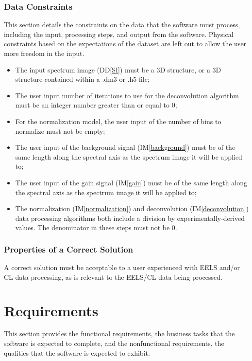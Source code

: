 \documentclass[12pt]{article}
\newcommand{\ddref}[1]{DD\ref{#1}}
\newcommand{\iref}[1]{IM\ref{#1}}
\begin{document}
\subsubsection{Data Constraints} \label{sec_DataConstraints}    
This section details the constraints on the data that the software must process, including the input, processing steps, and output from the software. Physical constraints based on the expectations of the dataset are left out to allow the user more freedom in the input.

\begin{itemize}
	\item The input spectrum image (\ddref{SI}) must be a 3D structure, or a 3D structure contained within a .dm3 or .h5 file;
	\item The user input number of iterations to use for the deconvolution algorithm must be an integer number greater than or equal to 0;
	\item For the normalization model, the user input of the number of bins to normalize must not be empty;
	\item The user input of the background signal (\iref{background}) must be of the same length along the spectral axis as the spectrum image it will be applied to;
	\item The user input of the gain signal (\iref{gain}) must be of the same length along the spectral axis as the spectrum image it will be applied to;
	\item The normalization ({\iref{normalization}}) and deconvolution ({\iref{deconvolution}}) data processing algorithms both include a division by experimentally-derived values. The denominator in these steps must not be 0.
\end{itemize}

\subsubsection{Properties of a Correct Solution} \label{sec_CorrectSolution}

\noindent
A correct solution must be acceptable to a user experienced with EELS and/or CL data processing, as is relevant to the EELS/CL data being processed.

\section{Requirements}

This section provides the functional requirements, the business tasks that the
software is expected to complete, and the nonfunctional requirements, the
qualities that the software is expected to exhibit.
\end{document}
